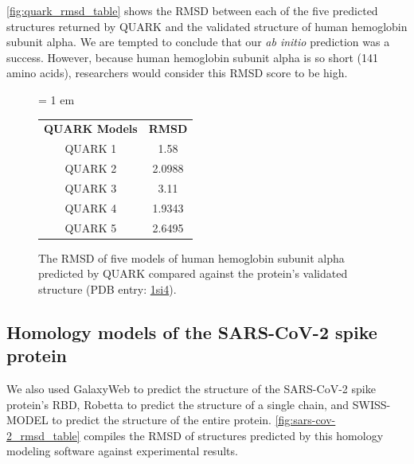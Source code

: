 \autoref{fig:quark_rmsd_table} shows the RMSD between each of the five predicted structures returned by QUARK and the validated structure of human hemoglobin subunit alpha. We are tempted to conclude that our \textit{ab initio} prediction was a success. However, because human hemoglobin subunit alpha is so short (141 amino acids), researchers would consider this RMSD score to be high.\fudgespace

\begin{figure}[h]
	\centering
	\tabcolsep = 1 em
	\mySfFamily
	\begin{tabular}{c c}
		\textbf{QUARK Models} & \textbf{RMSD} \\
		QUARK 1 & 1.58\phantom{xx} \\
		QUARK 2 & 2.0988\\
		QUARK 3 & 3.11\phantom{xx} \\
		QUARK 4 & 1.9343\\
		QUARK 5 & 2.6495
	\end{tabular}
	\caption{The RMSD of five models of human hemoglobin subunit alpha predicted by QUARK compared against the protein's validated structure (PDB entry: \href{https://www.rcsb.org/structure/1si4}{1si4}).}
	\label{fig:quark_rmsd_table}
\end{figure}


\FloatBarrier
{}
\subsection{Homology models of the SARS-CoV-2 spike protein}

We also used GalaxyWeb to predict the structure of the SARS-CoV-2 spike protein's RBD, Robetta to predict the structure of a single chain, and SWISS-MODEL to predict the structure of the entire protein. \autoref{fig:sars-cov-2_rmsd_table} compiles the RMSD of structures predicted by this homology modeling software against experimental results.\\

